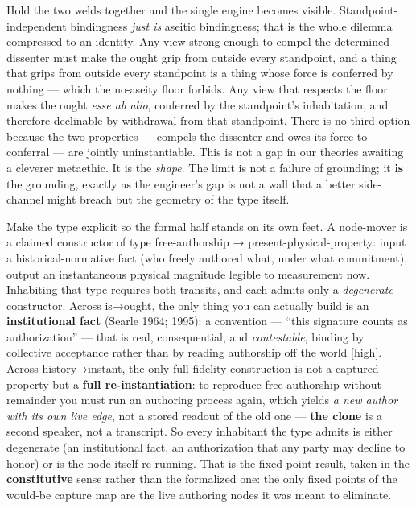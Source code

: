 \documentclass[11pt]{article}
\begin{document}
Hold the two welds together and the single engine becomes visible. Standpoint-independent bindingness \emph{just is} aseitic bindingness; that is the whole dilemma compressed to an identity. Any view strong enough to compel the determined dissenter must make the ought grip from outside every standpoint, and a thing that grips from outside every standpoint is a thing whose force is conferred by nothing — which the no-aseity floor forbids. Any view that respects the floor makes the ought \emph{esse ab alio}, conferred by the standpoint's inhabitation, and therefore declinable by withdrawal from that standpoint. There is no third option because the two properties — compels-the-dissenter and owes-its-force-to-conferral — are jointly uninstantiable. This is not a gap in our theories awaiting a cleverer metaethic. It is the \emph{shape}. The limit is not a failure of grounding; it \textbf{is} the grounding, exactly as the engineer's gap is not a wall that a better side-channel might breach but the geometry of the type itself.

Make the type explicit so the formal half stands on its own feet. A node-mover is a claimed constructor of type free-authorship → present-physical-property: input a historical-normative fact (who freely authored what, under what commitment), output an instantaneous physical magnitude legible to measurement now. Inhabiting that type requires both transits, and each admits only a \emph{degenerate} constructor. Across is→ought, the only thing you can actually build is an \textbf{institutional fact} (Searle 1964; 1995): a convention — ``this signature counts as authorization'' — that is real, consequential, and \emph{contestable}, binding by collective acceptance rather than by reading authorship off the world [high]. Across history→instant, the only full-fidelity construction is not a captured property but a \textbf{full re-instantiation}: to reproduce free authorship without remainder you must run an authoring process again, which yields \emph{a new author with its own live edge}, not a stored readout of the old one — \textbf{the clone} is a second speaker, not a transcript. So every inhabitant the type admits is either degenerate (an institutional fact, an authorization that any party may decline to honor) or is the node itself re-running. That is the fixed-point result, taken in the \textbf{constitutive} sense rather than the formalized one: the only fixed points of the would-be capture map are the live authoring nodes it was meant to eliminate.
\end{document}
